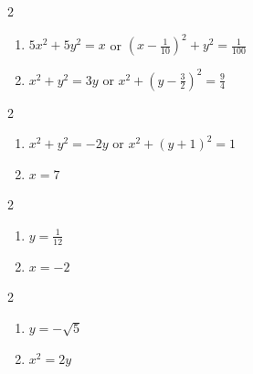 \documentclass{ximera}
\begin{document}
\begin{multicols}{2}

\begin{enumerate}

\setcounter{enumi}{\value{HW}}

\item $5x^2 + 5y^2 = x$ or $\left(x - \frac{1}{10}\right)^2+y^2 = \frac{1}{100}$
\item $x^2 + y^2  = 3y$ or $x^2 + \left(y - \frac{3}{2}\right)^2 = \frac{9}{4}$

\setcounter{HW}{\value{enumi}}

\end{enumerate}

\end{multicols}

\begin{multicols}{2}

\begin{enumerate}

\setcounter{enumi}{\value{HW}}

\item $x^2 + y^2 = -2y$ or $x^2+(y+1)^2 = 1$ 
\item  $x=7$  

\setcounter{HW}{\value{enumi}}

\end{enumerate}

\end{multicols}

\begin{multicols}{2}

\begin{enumerate}

\setcounter{enumi}{\value{HW}}

\item  $y = \frac{1}{12}$
\item  $x = -2$ 

\setcounter{HW}{\value{enumi}}

\end{enumerate}

\end{multicols}

\begin{multicols}{2}

\begin{enumerate}

\setcounter{enumi}{\value{HW}}

\item  $y= -\sqrt{5}$
\item  $x^2=2y$

\setcounter{HW}{\value{enumi}}

\end{enumerate}

\end{multicols}
\end{document}
